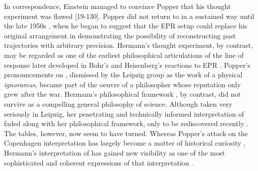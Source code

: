 \documentclass[final,12pt]{article}
\newcommand{\TE}{thought experiment\xspace}
\begin{document}
In correspondence, Einstein managed to convince Popper that his \TE was flawed [19-130]. Popper did not return to \qm in a sustained way until the late 1950s \citep{DelSanto2019}, when he began to suggest that the EPR setup could replace his original arrangement in demonstrating the possibility of reconstructing past trajectories with arbitrary precision. Hermann’s \TE, by contrast, may be regarded as one of the earliest philosophical articulations of the line of response later developed in Bohr’s and Heisenberg’s reactions to EPR \citep[sec.~4.4]{BacciagaluppiCrull2024}. Popper’s pronouncements on \qm, dismissed by the Leipzig group as the work of a physical \textit{ignoramus}, became part of the oeuvre of a philosopher whose reputation only grew after the war. Hermann’s philosophical framework \citep{Reichenberger2026}, by contrast, did not survive as a compelling general philosophy of science. Although taken very seriously in Leipzig, her penetrating and technically informed interpretation of \qm faded along with her philosophical framework, only to be rediscovered recently . The tables, however, now seem to have turned. Whereas Popper’s attack on the Copenhagen interpretation has largely become a matter of historical curiosity \citep{Howard2012}, Hermann’s interpretation of \qm has gained new visibility as one of the most sophisticated and coherent expressions of that interpretation \citep{Bacciagaluppi2025}.




\end{document}
